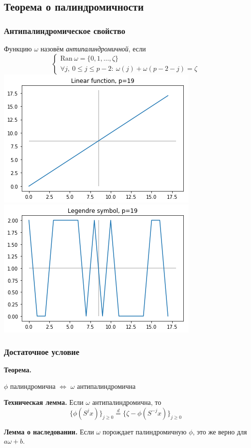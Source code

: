 \subsection{Теорема о палиндромичности}
\begin{frame}
\frametitle{Антипалиндромическое свойство}
Функцию $\omega$ назовём \textit{антипалиндромичной}, если
\[\begin{cases}
	\mathrm{Ran }\ \omega = \{0,1, \ldots, \zeta\} \\
	\forall j,\ 0 \le j \le p-2: \  \omega(j) + \omega(p-2-j) = \zeta
\end{cases}\]
\includegraphics[width=0.5\linewidth]{linear}\includegraphics[width=0.5\linewidth]{legendre}
\end{frame}

\begin{frame}
\frametitle{Достаточное условие}
\textbf{Теорема.}
\begin{center}$\phi$ палиндромична $\iff$ $\omega$ антипалиндромична \end{center}
 
\textbf{Техническая лемма.}
Если $\omega$ антипалиндромична, то $$\{\phi(S^j x)\}_{j \ge 0} \overset{d}{=} \{ \zeta - \phi(S^{-j} x)\}_{j \ge 0}$$

\textbf{Лемма о наследовании.}
Если $\omega$ порождает палиндромичную $\phi$, это же верно для $a\omega+b$.
\end{frame}

